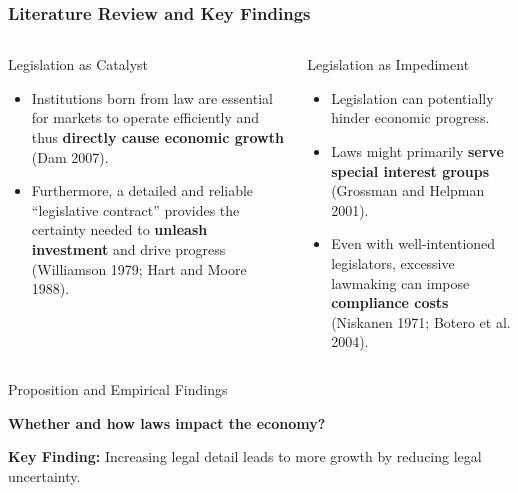 \documentclass{beamer}
\begin{document}
\begin{frame}
    \frametitle{Literature Review and Key Findings} 
\begin{columns}[T] 

\begin{column}{0.5\textwidth}
    \begin{block}{\small Legislation as Catalyst}
        {\footnotesize
        \begin{itemize}
            \item Institutions born from law are essential for markets to operate efficiently and thus \textbf{directly cause economic growth} (Dam 2007).
            \item Furthermore, a detailed and reliable “legislative contract” provides the certainty needed to \textbf{unleash investment} and drive progress (Williamson 1979; Hart and Moore 1988).
        \end{itemize}
        }
    \end{block}
\end{column}

\begin{column}{0.5\textwidth}
    \begin{block}{\small Legislation as Impediment}
        {\footnotesize
        \begin{itemize}
            \item Legislation can potentially hinder economic progress.
            \item Laws might primarily \textbf{serve special interest groups} (Grossman and Helpman 2001).
            \item Even with well-intentioned legislators, excessive lawmaking can impose \textbf{compliance costs} (Niskanen 1971; Botero et al. 2004).
        \end{itemize}
        }
    \end{block}
\end{column}
\end{columns}

\vspace{-0.3cm} %

\begin{block}{\small Proposition and Empirical Findings}
    {\footnotesize
    \textbf{ Whether and how laws impact the economy?}

    \textbf{Key Finding:} Increasing legal detail leads to more growth by reducing legal uncertainty.
    }
\end{block}

\end{frame}
\end{document}
